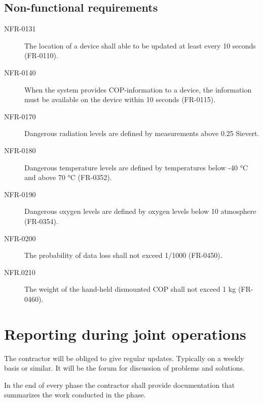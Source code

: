 \subsection{Non-functional requirements}
\begin{description}
\item[NFR-0131] The location of a device shall able to be updated at least every 10 seconds (FR-0110).
\item[NFR-0140] When the system provides COP-information to a device, the information must
be available on the device within 10 seconds (FR-0115).
\item[NFR-0170] Dangerous radiation levels are defined by measurements above 0.25 Sievert.
\item[NFR-0180] Dangerous temperature levels are defined by temperatures below -40 °C and
above 70 °C (FR-0352).
\item[NFR-0190] Dangerous oxygen levels are defined by oxygen levels below 10 %
atmosphere (FR-0354).
\item[NFR-0200] The probability of data loss shall not exceed 1/1000 (FR-0450).
\item[NFR.0210] The weight of the hand-held dismounted COP shall not exceed 1 kg (FR-0460).
\end{description}



\section{Reporting during joint operations}
The contractor will be obliged to give regular updates. Typically on a weekly basis or similar. It will be the forum for discussion of problems and solutions. 

In the end of every phase the contractor shall provide documentation that summarizes the work conducted in the phase.